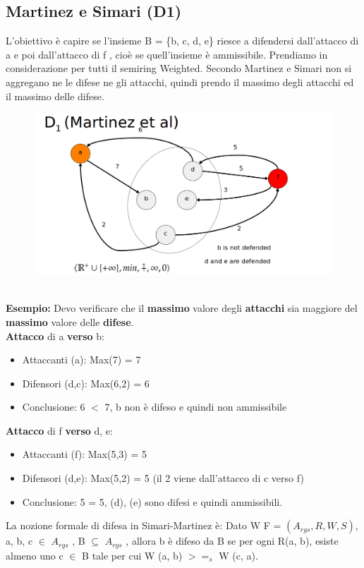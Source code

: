 \subsection{Martinez e Simari (D1)}
L’obiettivo è capire se l’insieme B = \{b, c, d, e\} riesce a difendersi dall’attacco di a e poi dall’attacco di f , cioè se quell'insieme è ammissibile. Prendiamo in considerazione per tutti il semiring Weighted. Secondo Martinez e Simari non si aggregano ne le difese ne gli attacchi, quindi prendo il massimo degli attacchi ed il massimo delle difese.
\begin{figure}[htp]
	\centering
    \includegraphics[width=13cm, keepaspectratio]{img/Cap6/martinez2.png}

\end{figure}
\\\textbf{Esempio:} Devo verificare che il \textbf{massimo} valore degli \textbf{attacchi} sia maggiore del \textbf{massimo} valore delle \textbf{difese}.
\\\textbf{Attacco} di a \textbf{verso} b:
\begin{itemize}
    \item Attaccanti (a): Max(7) = 7
    \item Difensori (d,c): Max(6,2) = 6
    \item Conclusione: 6 $<$ 7, b non è difeso e quindi non ammissibile
\end{itemize}
\textbf{Attacco} di f \textbf{verso} d, e:
\begin{itemize}
    \item  Attaccanti (f): Max(5,3) = 5
    \item Difensori (d,e): Max(5,2) = 5 (il 2 viene dall’attacco di c verso f)
    \item Conclusione: 5 = 5, (d), (e) sono difesi e quindi ammissibili.
\end{itemize}
La nozione formale di difesa in Simari-Martinez è: Dato W F = $(A_{rgs} , R, W, S)$, a, b, c $\in$ $A_{rgs}$ , B $\subseteq$ $A_{rgs}$ , allora b è difeso da B se per ogni R(a, b), esiste almeno uno c $\in$ B tale per cui W (a, b) $>=_s$ W (c, a).


